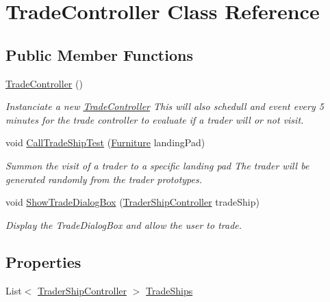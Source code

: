 \hypertarget{class_trade_controller}{}\section{Trade\+Controller Class Reference}
\label{class_trade_controller}
\subsection*{Public Member Functions}
\begin{DoxyCompactItemize}
\item 
\hyperlink{class_trade_controller_a31ae81741652d739cada9e4748602eea}{Trade\+Controller} ()
\begin{DoxyCompactList}\small\item\em Instanciate a new \hyperlink{class_trade_controller}{Trade\+Controller} This will also schedull and event every 5 minutes for the trade controller to evaluate if a trader will or not visit. \end{DoxyCompactList}\item 
void \hyperlink{class_trade_controller_a3399d14053c365d46014f16de0a6d06f}{Call\+Trade\+Ship\+Test} (\hyperlink{class_furniture}{Furniture} landing\+Pad)
\begin{DoxyCompactList}\small\item\em Summon the visit of a trader to a specific landing pad The trader will be generated randomly from the trader prototypes. \end{DoxyCompactList}\item 
void \hyperlink{class_trade_controller_a3b10006f08fa95dc787eb1e669431a96}{Show\+Trade\+Dialog\+Box} (\hyperlink{class_trader_ship_controller}{Trader\+Ship\+Controller} trade\+Ship)
\begin{DoxyCompactList}\small\item\em Display the Trade\+Dialog\+Box and allow the user to trade. \end{DoxyCompactList}\end{DoxyCompactItemize}
\subsection*{Properties}
\begin{DoxyCompactItemize}
\item 
List$<$ \hyperlink{class_trader_ship_controller}{Trader\+Ship\+Controller} $>$ \hyperlink{class_trade_controller_a176bd07b91984f599e56ce39664f41ff}{Trade\+Ships}
\end{DoxyCompactItemize}


